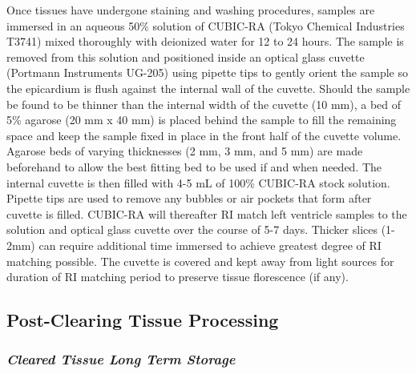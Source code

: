 Once tissues have undergone staining and washing procedures, samples are immersed in an aqueous 50\% solution of CUBIC-RA (Tokyo Chemical Industries T3741) mixed thoroughly with deionized water for 12 to 24 hours. The sample is removed from this solution and positioned inside an optical glass cuvette (Portmann Instruments UG-205) using pipette tips to gently orient the sample so the epicardium is flush against the internal wall of the cuvette. Should the sample be found to be thinner than the internal width of the cuvette (10 mm), a bed of 5\% agarose (20 mm x 40 mm) is placed behind the sample to fill the remaining space and keep the sample fixed in place in the front half of the cuvette volume. Agarose beds of varying thicknesses (2 mm, 3 mm, and 5 mm) are made beforehand to allow the best fitting bed to be used if and when needed. The internal cuvette is then filled with 4-5 mL of 100\% CUBIC-RA stock solution. Pipette tips are used to remove any bubbles or air pockets that form after cuvette is filled. CUBIC-RA will thereafter RI match left ventricle samples to the solution and optical glass cuvette over the course of 5-7 days. Thicker slices (1-2mm) can require additional time immersed to achieve greatest degree of RI matching possible. The cuvette is covered and kept away from light sources for duration of RI matching period to preserve tissue florescence (if any). 

\subsection{Post-Clearing Tissue Processing}
\subsubsection{\textit{Cleared Tissue Long Term Storage}}

